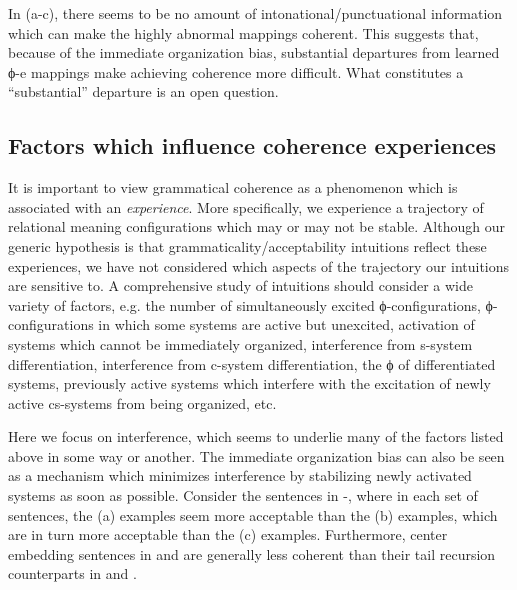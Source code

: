 \ea\label{ex:6:14}
\z
\z

In (a-c), there seems to be no amount of intonational/punctuational information which can make the highly abnormal mappings coherent. This suggests that, because of the immediate organization bias, substantial departures from learned ϕ-e mappings make achieving coherence more difficult. What constitutes a “substantial” departure is an open question.

\subsection{Factors which influence coherence experiences}

It is important to view grammatical coherence as a phenomenon which is associated with an \textit{experience}. More specifically, we experience a trajectory of relational meaning configurations which may or may not be stable. Although our generic hypothesis is that grammaticality/acceptability intuitions reflect these experiences, we have not considered which aspects of the trajectory our intuitions are sensitive to. A comprehensive study of intuitions should consider a wide variety of factors, e.g. the number of simultaneously excited ϕ-configurations, ϕ-configurations in which some systems are active but unexcited, activation of systems which cannot be immediately organized, interference from s-system differentiation, interference from c-system differentiation, the ϕ of differentiated systems, previously active systems which interfere with the excitation of newly active cs-systems from being organized, etc. 

  Here we focus on interference, which seems to underlie many of the factors listed above in some way or another. The immediate organization bias can also be seen as a mechanism which minimizes interference by stabilizing newly activated systems as soon as possible. Consider the sentences in -, where in each set of sentences, the (a) examples seem more acceptable than the (b) examples, which are in turn more acceptable than the (c) examples. Furthermore, center embedding sentences in  and  are generally less coherent than their tail recursion counterparts in  and .  

